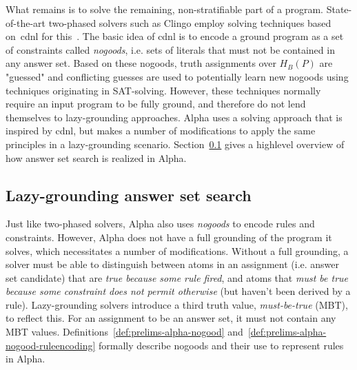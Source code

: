 What remains is to solve the remaining, non-stratifiable part of a program. State-of-the-art two-phased solvers such as Clingo employ solving techniques based on~\gls{cdnl} for this~\cite{clasp-cdnl}. The basic idea of \gls{cdnl} is to encode a ground program as a set of constraints called \emph{nogoods}, i.e. sets of literals that must not be contained in any answer set. Based on these nogoods, truth assignments over $H_B(P)$ are "guessed" and conflicting guesses are used to potentially learn new nogoods using techniques originating in SAT-solving. However, these techniques normally require an input program to be fully ground, and therefore do not lend themselves to lazy-grounding approaches. Alpha uses a solving approach that is inspired by \gls{cdnl}, but makes a number of modifications to apply the same principles in a lazy-grounding scenario. Section~\ref{subsec:prelims-lazygrounding-alpha-cdnl} gives a highlevel overview of how answer set search is realized in Alpha.

\subsection{Lazy-grounding answer set search}
\label{subsec:prelims-lazygrounding-alpha-cdnl}

Just like two-phased solvers, Alpha also uses \emph{nogoods} to encode rules and constraints. However, Alpha does not have a full grounding of the program it solves, which necessitates a number of modifications. Without a full grounding, a solver must be able to distinguish between atoms in an assignment (i.e. answer set candidate) that are \emph{true because some rule fired}, and atoms that \emph{must be true because some constraint does not permit otherwise} (but haven't been derived by a rule). Lazy-grounding solvers introduce a third truth value, \emph{must-be-true} (MBT), to reflect this. For an assignment to be an answer set, it must not contain any MBT values. Definitions~\ref{def:prelims-alpha-nogood} and~\ref{def:prelims-alpha-nogood-ruleencoding} formally describe nogoods and their use to represent rules in Alpha.

